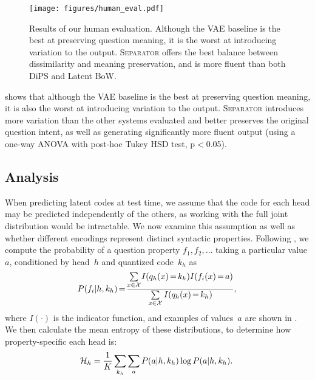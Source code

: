\documentclass[11pt,a4paper]{article}
\begin{document}
\begin{figure}
    \centering
    \texttt{[image: figures/human\_eval.pdf]}
\caption{Results of our human evaluation. Although the VAE
      baseline is the best at preserving question meaning, it is the
      worst at introducing variation to the output. \textsc{Separator}
      offers the best balance between dissimilarity and meaning
      preservation, and is more fluent than both DiPS and Latent BoW.} 
    \label{fig:humaneval}
\end{figure}

 shows that although the VAE baseline is the best
at preserving question meaning, it is also the worst at introducing
variation to the output. \textsc{Separator} introduces more variation
than the other systems evaluated and better preserves the original
question intent, as well as generating significantly more fluent
output (using a one-way ANOVA with post-hoc Tukey HSD test,
\mbox{p$<$0.05}).

\subsection{Analysis}




\label{sec:heads}



When predicting latent codes at test time, we assume that the code for
each head may be predicted independently of the others, as working
with the full joint distribution would be intractable. We now examine
this assumption as well as whether different encodings represent
distinct syntactic properties. Following
\citet{angelidis2020extractive}, we compute the probability of
a question property ${f_1, f_2, \ldots}$ taking a particular value $a$, conditioned by head~$h$ and
quantized code~$k_h$ as
\begin{equation}
\hspace*{-.32cm}
P(f_i | h, k_h)\hspace*{-.3ex}=\hspace*{-.3ex}\frac{\hspace*{-.2ex}\sum\limits_{x \in \mathcal{X}}\hspace*{-.3ex}I(q_h(x)\hspace*{-.3ex}=\hspace*{-.3ex}k_h)  I(f_i(x)\hspace*{-.3ex}=\hspace*{-.3ex}a)}{\sum\limits_{x \in \mathcal{X}} I(q_h(x)\hspace*{-.3ex}=\hspace*{-.3ex}k_h)},\hspace*{-.25cm}
\end{equation}
where $I(\cdot)$ is the indicator function, and examples of values~$a$ are shown in
. We then calculate the mean entropy of
these distributions, to determine how property-specific each head is:
\begin{equation}
    \hspace*{-.25cm}\mathcal{H}_h = \frac{1}{K} \sum_{k_h}  \sum_a P(a| h, k_h) \log P(a| h, k_h). \hspace*{-.15cm}
\end{equation}
\end{document}
